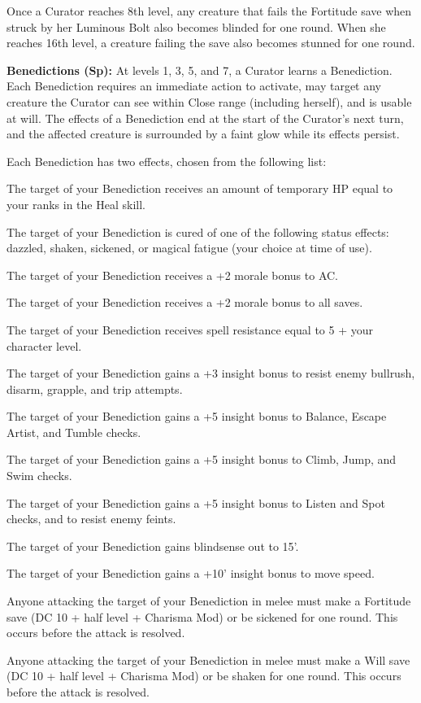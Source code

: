 Once a Curator reaches 8th level, any creature that fails the Fortitude save when struck by her Luminous Bolt also becomes blinded for one round. When she reaches 16th level, a creature failing the save also becomes stunned for one round.

\textbf{Benedictions (Sp):} At levels 1, 3, 5, and 7, a Curator learns a Benediction. Each Benediction requires an immediate action to activate, may target any creature the Curator can see within Close range (including herself), and is usable at will. The effects of a Benediction end at the start of the Curator's next turn, and the affected creature is surrounded by a faint glow while its effects persist.

Each Benediction has two effects, chosen from the following list:
\begin{itemize*}
\item The target of your Benediction receives an amount of temporary HP equal to your ranks in the Heal skill.
\item The target of your Benediction is cured of one of the following status effects: dazzled, shaken, sickened, or magical fatigue (your choice at time of use).
\item The target of your Benediction receives a +2 morale bonus to AC.
\item The target of your Benediction receives a +2 morale bonus to all saves.
\item The target of your Benediction receives spell resistance equal to 5 + your character level.
\item The target of your Benediction gains a +3 insight bonus to resist enemy bullrush, disarm, grapple, and trip attempts.
\item The target of your Benediction gains a +5 insight bonus to Balance, Escape Artist, and Tumble checks.
\item The target of your Benediction gains a +5 insight bonus to Climb, Jump, and Swim checks.
\item The target of your Benediction gains a +5 insight bonus to Listen and Spot checks, and to resist enemy feints.
\item The target of your Benediction gains blindsense out to 15'.
\item The target of your Benediction gains a +10' insight bonus to move speed.
\item Anyone attacking the target of your Benediction in melee must make a Fortitude save (DC 10 + half level + Charisma Mod) or be sickened for one round. This occurs before the attack is resolved.
\item Anyone attacking the target of your Benediction in melee must make a Will save (DC 10 + half level + Charisma Mod) or be shaken for one round. This occurs before the attack is resolved.
\end{itemize*}


